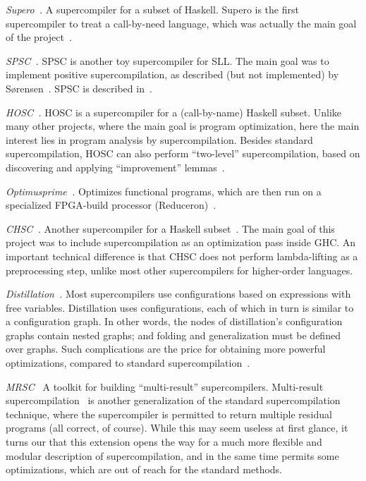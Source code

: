 \begin{longitem}
\item \emph{Supero~\cite{SuperoUrl}.} A supercompiler for a subset of Haskell.
Supero is the first supercompiler to treat a call-by-need language,
which was actually the main goal of the 
project~\cite{Mitchell2008taa,Mitchell2010Rethinking}.

\item \emph{SPSC~\cite{SpscUrl}.} SPSC is another toy supercompiler for SLL\@.
The main goal was to implement positive supercompilation,
as described (but not implemented) by 
S{\o}rensen~\cite{Sorensen1996Positive,Sorensen1998Introduction}. 
SPSC is described in~\cite{Klyuchnikov2009SPSC}.

\item \emph{HOSC~\cite{HoscUrl}.} HOSC is
a supercompiler for a (call-by-name) Haskell subset.
Unlike many other projects, where the main goal is program optimization,
here the main interest lies in program analysis by supercompilation.
Besides standard supercompilation, HOSC can also perform
``two-level'' supercompilation, based on discovering and applying 
``improvement'' lemmas~\cite{Klyuchnikov2010Phd,Klyuchnikov2010Fast}.

\item \emph{Optimusprime~\cite{OptimusprimeUrl}.} Optimizes
functional programs, which are then run on a specialized FPGA-build
processor (Reduceron)~\cite{Reich2010Reduceron}.

\item \emph{CHSC~\cite{ChscUrl}.} Another
supercompiler for a Haskell subset~\cite{Bolingbroke2010Eval}.
The main goal of this project was to include supercompilation
as an optimization pass inside GHC\@.
An important technical difference is that CHSC does not perform
lambda-lifting as a preprocessing step, unlike most other
supercompilers for higher-order languages.

\item \emph{Distillation~\cite{DistillUrl}.} Most
supercompilers use configurations based on expressions with free variables.
Distillation uses configurations, each of which in turn is 
similar to a configuration graph. 
In other words, the nodes of distillation's configuration graphs contain nested graphs;
and folding and generalization must be defined over graphs. 
Such complications are the price for obtaining more powerful
optimizations, compared to standard 
supercompilation~\cite{Hamilton2007Distillation,Hamilton2010Graph}.

\item \emph{MRSC~\cite{MrscUrl}} A toolkit 
for building ``multi-result'' supercompilers.
Multi-result supercompilation~\cite{klyuchnikov2011mrsc} is another generalization of the standard
supercompilation technique, where the supercompiler is permitted to
return multiple residual programs (all correct, of course).
While this may seem useless at first glance, it turns our that 
this extension opens the way for a much more flexible and modular
description of supercompilation, and in the same time permits
some optimizations, which are out of reach for the standard methods.


\end{longitem}
